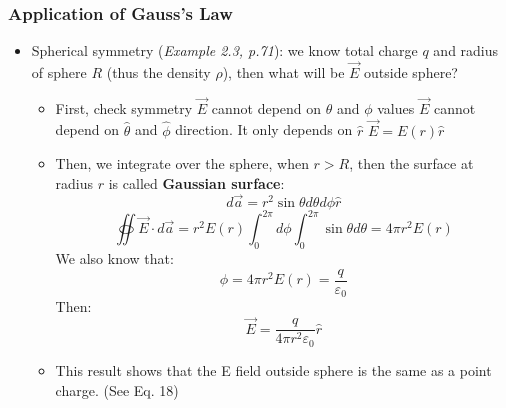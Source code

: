 \documentclass[12pt,a4paper,twoside]{article}
\begin{document}
\subsubsection{Application of Gauss's Law}
    \begin{itemize}
        \item Spherical symmetry (\textit{Example 2.3, p.71}): we know total charge $q$ and radius of sphere $R$ (thus the density $\rho$), then what will be $\overrightarrow{E}$ outside sphere?
            \begin{itemize}
                \item First, check symmetry
                    \subitem $\overrightarrow{E}$ cannot depend on $\theta$ and $\phi$ values
                    \subitem $\overrightarrow{E}$ cannot depend on $\hat{\theta}$ and $\hat{\phi}$ direction. It only depends on $\hat{r}$
                    \subitem \(\overrightarrow{E}=E(r)\hat{r}\)
                \item Then, we integrate over the sphere, when $r>R$, then the surface at radius $r$ is called \textbf{Gaussian surface}:
                    \[d\overrightarrow{a}=r^2\sin\theta d\theta d\phi \hat{r}\]
                    \[\oiint \overrightarrow{E}\cdot d\overrightarrow{a}=r^2E(r)\int_{0}^{2\pi}d\phi\int_{0}^{2\pi}\sin\theta d\theta = 4\pi r^2E(r)\]
                    We also know that:
                    \[\phi=4\pi r^2E(r)=\frac{q}{\varepsilon_0}\]
                    Then:
                    \[\overrightarrow{E}=\frac{q}{4\pi r^2\varepsilon_0}\hat{r}\]
                \item This result shows that the E field outside sphere is the same as a point charge. (See Eq. 18)
            \end{itemize}
        

\end{itemize}
\end{document}
